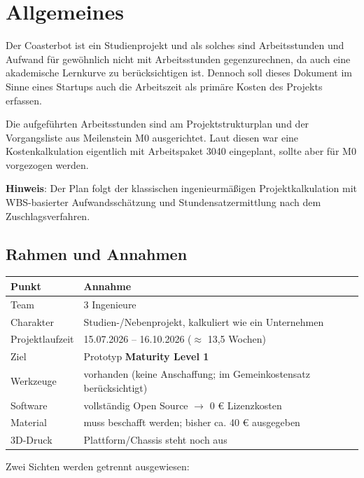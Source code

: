 \documentclass[
  a4paper,
  12pt,
  DIV=12,        %
  parskip=half,  %
  headings=small %
]{scrartcl}
\theoremstyle{definition}
\theoremstyle{definition}
\begin{document}
\newpage

\tableofcontents

\newpage

\section{Allgemeines}

Der Coasterbot ist ein Studienprojekt und als solches sind Arbeitsstunden und Aufwand für gewöhnlich nicht mit Arbeitsstunden gegenzurechnen, da auch eine akademische Lernkurve zu berücksichtigen ist. Dennoch soll dieses Dokument im Sinne eines Startups auch die Arbeitszeit als primäre Kosten des Projekts erfassen. 

Die aufgeführten Arbeitsstunden sind am Projektstrukturplan und der Vorgangsliste aus Meilenstein M0 ausgerichtet. Laut diesen war eine Kostenkalkulation eigentlich mit Arbeitspaket 3040 eingeplant, sollte aber für M0 vorgezogen werden. 

\textbf{Hinweis}: Der Plan folgt der klassischen ingenieurmäßigen Projektkalkulation mit WBS-basierter Aufwandsschätzung und Stundensatzermittlung nach dem Zuschlagsverfahren. 


\subsection{Rahmen und Annahmen}


\begin{tabularx}{\textwidth}{lX@{}}
\toprule
\textbf{Punkt} & \textbf{Annahme} \\
\midrule
Team & 3 Ingenieure \\
Charakter & Studien-/Nebenprojekt, kalkuliert wie ein Unternehmen \\
Projektlaufzeit & 15.07.2026 – 16.10.2026 ($\approx$ 13,5 Wochen) \\
Ziel & Prototyp \textbf{Maturity Level 1} \\
Werkzeuge & vorhanden (keine Anschaffung; im Gemeinkostensatz berücksichtigt) \\
Software & vollständig Open Source $\rightarrow$ 0 € Lizenzkosten \\
Material & muss beschafft werden; bisher ca. 40 \euro{ } ausgegeben \\
3D-Druck & Plattform/Chassis steht noch aus \\
\bottomrule
\end{tabularx}


Zwei Sichten werden getrennt ausgewiesen:
\end{document}
